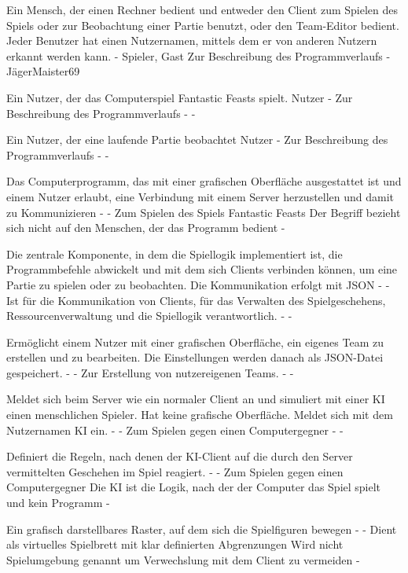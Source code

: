 {Ein Mensch, der einen Rechner bedient und entweder den Client zum Spielen des Spiels oder zur Beobachtung einer Partie benutzt, oder den Team-Editor bedient. Jeder Benutzer hat einen Nutzernamen, mittels dem er von anderen Nutzern erkannt werden kann.}
{-}
{Spieler, Gast}
{Zur Beschreibung des Programmverlaufs}
{-}
{JägerMaister69}

{Ein Nutzer, der das Computerspiel \glqq{}Fantastic Feasts\grqq{}  spielt.}
{Nutzer}
{-}
{Zur Beschreibung des Programmverlaufs}
{-}
{-}

{Ein Nutzer, der eine laufende Partie beobachtet}
{Nutzer}
{-}
{Zur Beschreibung des Programmverlaufs}
{-}
{-}

{Das Computerprogramm, das mit einer grafischen Oberfläche ausgestattet ist und einem Nutzer erlaubt, eine Verbindung mit einem Server herzustellen und damit zu Kommunizieren}
{-}
{-}
{Zum Spielen des Spiels \glqq{}Fantastic Feasts\grqq{} }
{Der Begriff bezieht sich nicht auf den Menschen, der das Programm bedient}
{-}

{Die zentrale Komponente, in dem die Spiellogik implementiert ist, die Programmbefehle abwickelt und mit dem sich Clients verbinden können, um eine Partie zu spielen oder zu beobachten. Die Kommunikation erfolgt mit JSON}
{-}
{-}
{Ist für die Kommunikation von Clients, für das Verwalten des Spielgeschehens, Ressourcenverwaltung und die Spiellogik verantwortlich.}
{-}
{-}

{Ermöglicht einem Nutzer mit einer grafischen Oberfläche, ein eigenes Team zu erstellen und zu bearbeiten. Die Einstellungen werden danach als JSON-Datei gespeichert.}
{-}
{-}
{Zur Erstellung von nutzereigenen Teams.}
{-}
{-}

{Meldet sich beim Server wie ein normaler Client an und simuliert mit einer KI einen menschlichen Spieler. Hat keine grafische Oberfläche. Meldet sich mit dem Nutzernamen \glqq{}KI\grqq{}  ein.}
{-}
{-}
{Zum Spielen gegen einen Computergegner}
{-}
{-}

{Definiert die Regeln, nach denen der KI-Client auf die durch den Server vermittelten Geschehen im Spiel reagiert.}
{-}
{-}
{Zum Spielen gegen einen Computergegner}
{Die KI ist die Logik, nach der der Computer das Spiel spielt und kein Programm}
{-}

{Ein grafisch darstellbares Raster, auf dem sich die Spielfiguren bewegen}
{-}
{-}
{Dient als virtuelles Spielbrett mit klar definierten Abgrenzungen}
{Wird nicht Spielumgebung genannt um Verwechslung mit dem Client zu vermeiden}
{-}

